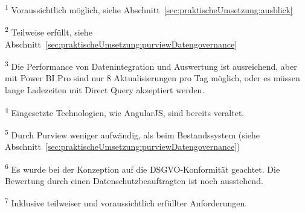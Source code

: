 \begin{scriptsize}
\noindent\textsuperscript{1} Voraussichtlich möglich, siehe Abschnitt~\ref{sec:praktischeUmsetzung:ausblick}

\noindent\textsuperscript{2} Teilweise erfüllt, siehe Abschnitt~\ref{sec:praktischeUmsetzung:purviewDatengovernance}

\noindent\textsuperscript{3} Die Performance von Datenintegration und Auswertung ist ausreichend, aber mit Power BI Pro sind nur 8 Aktualisierungen pro Tag möglich, oder es müssen lange Ladezeiten mit Direct Query akzeptiert werden.

\noindent\textsuperscript{4} Eingesetzte Technologien, wie AngularJS, sind bereits veraltet.

\noindent\textsuperscript{5} Durch Purview weniger aufwändig, als beim Bestandssystem (siehe Abschnitt~\ref{sec:praktischeUmsetzung:purviewDatengovernance})

\noindent\textsuperscript{6} Es wurde bei der Konzeption auf die DSGVO-Konformität geachtet. Die Bewertung durch einen Datenschutzbeauftragten ist noch ausstehend.

\noindent\textsuperscript{7} Inklusive teilweiser und voraussichtlich erfüllter Anforderungen. 

\end{scriptsize}